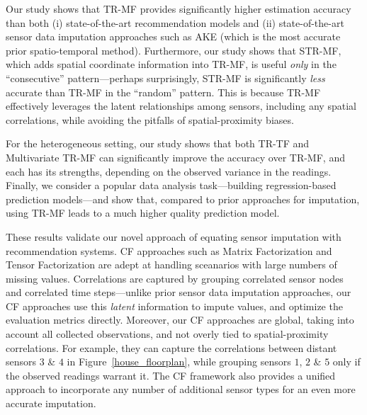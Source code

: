 Our study shows that TR-MF provides significantly higher estimation accuracy than 
both (i) state-of-the-art recommendation models and (ii) state-of-the-art sensor data imputation approaches 
such as AKE (which is the most accurate prior spatio-temporal method).
Furthermore, our study shows that STR-MF, which adds spatial coordinate information into TR-MF, 
is useful {\em only} in the ``consecutive'' pattern---perhaps surprisingly,
STR-MF is significantly {\em less} accurate than TR-MF in the ``random'' pattern.  This is because TR-MF
effectively leverages the latent relationships among sensors, including any spatial correlations, while avoiding the
pitfalls of spatial-proximity biases.

For the heterogeneous setting, our study shows that both TR-TF and
Multivariate TR-MF can significantly improve the accuracy over TR-MF,
and each has its strengths, depending on the observed variance in the
readings.  Finally, we consider a popular data analysis task---building regression-based prediction models---and show that,
compared to prior approaches for imputation, using TR-MF leads to a much higher quality prediction model.

These results validate our novel approach of equating sensor imputation with recommendation systems.  
CF approaches such as Matrix Factorization and Tensor Factorization are adept at handling sceanarios 
with large numbers of missing values.  Correlations are captured by grouping correlated sensor nodes and correlated time
steps---unlike prior sensor data imputation approaches, our CF
approaches use this {\em latent} information to impute values, and optimize the evaluation metrics directly. 
Moreover, our CF approaches are global, taking into account all
collected observations, and not overly tied to spatial-proximity
correlations.  For example, they can capture the correlations between
distant sensors $3$ \& $4$ in Figure~\ref{house_floorplan}, while
grouping sensors $1$, $2$ \& $5$ only if the observed readings warrant
it.  The CF framework also provides a unified approach to incorporate
any number of additional sensor types for an even more accurate imputation.


